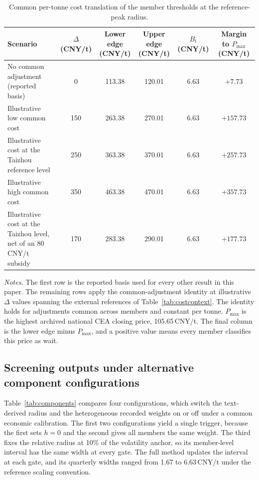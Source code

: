 \begin{table}[!t]
\caption{Common per-tonne cost translation of the member thresholds at the reference-peak radius.}
\label{tab:translation}
\centering
\footnotesize
\begin{tabular}{@{}lccccc@{}}
\toprule
Scenario & \makecell{$\Delta$\\(CNY/t)} & \makecell{Lower edge\\(CNY/t)} & \makecell{Upper edge\\(CNY/t)} & \makecell{$B_t$\\(CNY/t)} & \makecell{Margin to $P_{\max}$\\(CNY/t)}\\
\midrule
No common adjustment (reported basis) & 0 & 113.38 & 120.01 & 6.63 & $+7.73$\\
Illustrative low common cost & 150 & 263.38 & 270.01 & 6.63 & $+157.73$\\
Illustrative cost at the Taizhou reference level & 250 & 363.38 & 370.01 & 6.63 & $+257.73$\\
Illustrative high common cost & 350 & 463.38 & 470.01 & 6.63 & $+357.73$\\
Illustrative cost at the Taizhou level, net of an 80\,CNY/t subsidy & 170 & 283.38 & 290.01 & 6.63 & $+177.73$\\
\bottomrule
\end{tabular}
\par\smallskip
\parbox{0.95\textwidth}{\footnotesize\emph{Notes.} The first row is the reported basis used for every other result in this paper. The remaining rows apply the common-adjustment identity at illustrative $\Delta$ values spanning the external references of Table~\ref{tab:costcontext}. The identity holds for adjustments common across members and constant per tonne. $P_{\max}$ is the highest archived national CEA closing price, 105.65\,CNY/t. The final column is the lower edge minus $P_{\max}$, and a positive value means every member classifies this price as wait.}
\end{table}

\subsection{Screening outputs under alternative component configurations}

Table~\ref{tab:components} compares four configurations, which switch the text-derived radius and the heterogeneous recorded weights on or off under a common economic calibration. The first two configurations yield a single trigger, because the first sets $h=0$ and the second gives all members the same weight. The third fixes the relative radius at 10\% of the volatility anchor, so its member-level interval has the same width at every gate. The full method updates the interval at each gate, and its quarterly widths ranged from 1.67 to 6.63\,CNY/t under the reference scaling convention.

